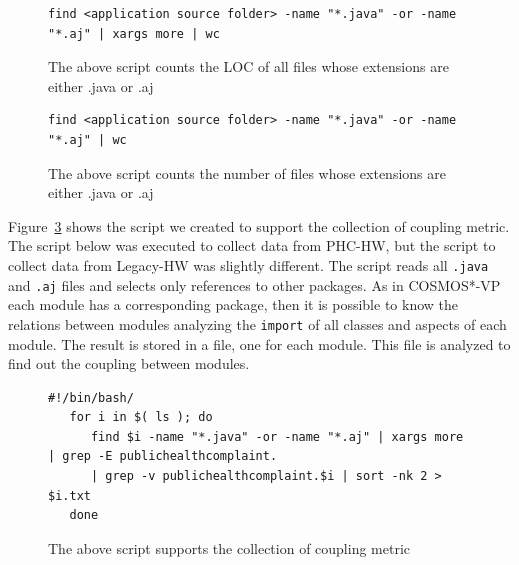 \documentclass[11pt,twoside]{article}
\begin{document}
\begin{figure}

\begin{lstlisting}
find <application source folder> -name "*.java" -or -name "*.aj" | xargs more | wc
\end{lstlisting}
\caption{The above  script counts the LOC of all files whose extensions are either .java or .aj}
\label{lst:countCode}
\end{figure}

\begin{figure}
\begin{lstlisting}
find <application source folder> -name "*.java" -or -name "*.aj" | wc
\end{lstlisting}
\caption{The above  script counts the number of files whose extensions are either .java or .aj}
\label{lst:countFile}
\end{figure}

Figure~\ref{lst:coupling} shows the script we created to support the collection of coupling metric. The script below was executed to collect data from PHC-HW,
but the script to collect data from Legacy-HW was slightly different. The script reads all \texttt{.java} and \texttt{.aj} files and selects only references to other packages. As in COSMOS*-VP each module has a corresponding package, then it is possible to know the relations between modules analyzing the \texttt{import} of all classes and aspects of each module.
The result is stored in a file, one for each module. This file is analyzed to find out the coupling between modules.

\begin{figure}
\begin{lstlisting}
#!/bin/bash/
   for i in $( ls ); do
      find $i -name "*.java" -or -name "*.aj" | xargs more | grep -E publichealthcomplaint. 
      | grep -v publichealthcomplaint.$i | sort -nk 2 > $i.txt
   done
\end{lstlisting}
\caption{The above script supports the collection of coupling metric}
\label{lst:coupling}
\end{figure}






\end{document}

